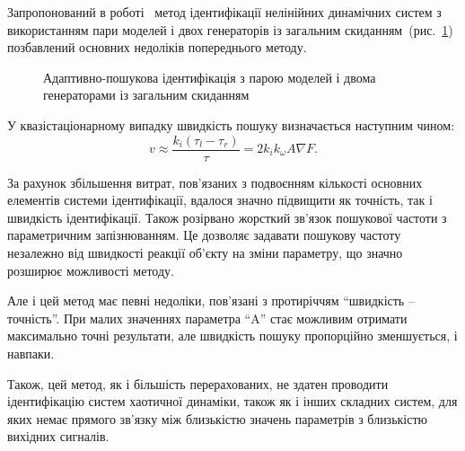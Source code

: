 Запропонований в роботі~\cite{atu_phd_thesis} метод ідентифікації
нелінійних динамічних систем з використанням пари моделей
і двох генераторів із загальним скиданням~(рис.~\ref{atu:f:apid2})
позбавлений основних недоліків попереднього методу.

\begin{figure}[htb!]
\begin{center}

\end{center}
\caption{Адаптивно-пошукова ідентифікація з парою моделей і двома генераторами із загальним скиданням}
\label{atu:f:apid2}
\end{figure}


У квазістаціонарному випадку швидкість пошуку визначається
наступним чином:
%
\begin{equation}
\label{atu:eq:vugpk2}
  v
  \approx
  \frac{k_i (\tau_l - \tau_r)}{\tau}
  =
  2 k_i k_\omega A \nabla F .
\end{equation}

За рахунок збільшення витрат, пов'язаних з подвоєнням кількості
основних елементів системи ідентифікації, вдалося значно
підвищити як точність, так і швидкість ідентифікації.
Також розірвано жорсткий зв'язок пошукової частоти з
параметричним запізнюванням. Це дозволяє задавати
пошукову частоту незалежно від швидкості реакції об'єкту
на зміни параметру, що значно розширює можливості методу.

Але і цей метод має певні недоліки, пов'язані
з протиріччям ``швидкість -- точність''.
При малих значеннях параметра ``A''
стає можливим отримати максимально точні результати,
але швидкість пошуку пропорційно зменшується,
і навпаки.

Також, цей метод, як і більшість перерахованих,
не здатен проводити ідентифікацію  систем хаотичної динаміки,
також як і інших складних систем, для яких немає
прямого зв'язку між
близькістю значень параметрів з близькістю вихідних сигналів.










%
%
%

